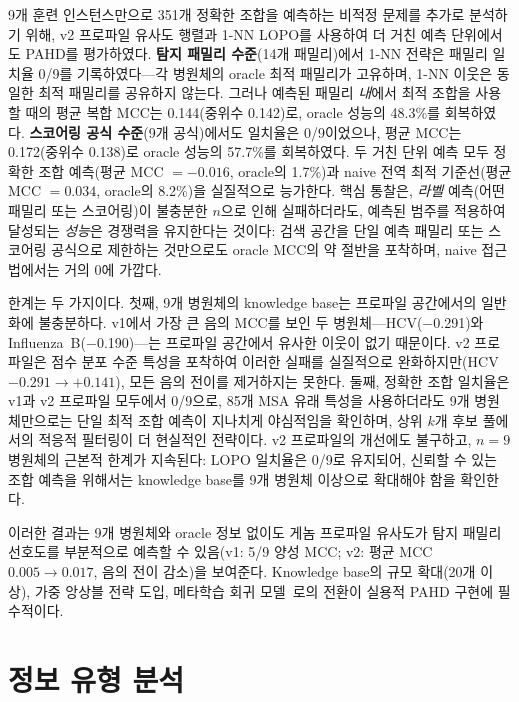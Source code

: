 9개 훈련 인스턴스만으로 351개 정확한 조합을 예측하는 비적정 문제를 추가로 분석하기 위해, v2 프로파일 유사도 행렬과 1-NN LOPO를 사용하여 더 거친 예측 단위에서도 PAHD를 평가하였다.
\textbf{탐지 패밀리 수준}(14개 패밀리)에서 1-NN 전략은 패밀리 일치율 0/9를 기록하였다---각 병원체의 oracle 최적 패밀리가 고유하며, 1-NN 이웃은 동일한 최적 패밀리를 공유하지 않는다.
그러나 예측된 패밀리 \emph{내}에서 최적 조합을 사용할 때의 평균 복합 MCC는 0.144(중위수 0.142)로, oracle 성능의 48.3\%를 회복하였다.
\textbf{스코어링 공식 수준}(9개 공식)에서도 일치율은 0/9이었으나, 평균 MCC는 0.172(중위수 0.138)로 oracle 성능의 57.7\%를 회복하였다.
두 거친 단위 예측 모두 정확한 조합 예측(평균 MCC $= -0.016$, oracle의 1.7\%)과 naive 전역 최적 기준선(평균 MCC $= 0.034$, oracle의 8.2\%)을 실질적으로 능가한다.
핵심 통찰은, \emph{라벨} 예측(어떤 패밀리 또는 스코어링)이 불충분한 $n$으로 인해 실패하더라도, 예측된 범주를 적용하여 달성되는 \emph{성능}은 경쟁력을 유지한다는 것이다: 검색 공간을 단일 예측 패밀리 또는 스코어링 공식으로 제한하는 것만으로도 oracle MCC의 약 절반을 포착하며, naive 접근법에서는 거의 0에 가깝다.

한계는 두 가지이다.
첫째, 9개 병원체의 knowledge base는 프로파일 공간에서의 일반화에 불충분하다.
v1에서 가장 큰 음의 MCC를 보인 두 병원체---HCV($-$0.291)와 Influenza~B($-$0.190)---는 프로파일 공간에서 유사한 이웃이 없기 때문이다.
v2 프로파일은 점수 분포 수준 특성을 포착하여 이러한 실패를 실질적으로 완화하지만(HCV $-0.291 \rightarrow +0.141$), 모든 음의 전이를 제거하지는 못한다.
둘째, 정확한 조합 일치율은 v1과 v2 프로파일 모두에서 0/9으로, 85개 MSA 유래 특성을 사용하더라도 9개 병원체만으로는 단일 최적 조합 예측이 지나치게 야심적임을 확인하며, 상위 $k$개 후보 풀에서의 적응적 필터링이 더 현실적인 전략이다.
v2 프로파일의 개선에도 불구하고, $n = 9$ 병원체의 근본적 한계가 지속된다: LOPO 일치율은 0/9로 유지되어, 신뢰할 수 있는 조합 예측을 위해서는 knowledge base를 9개 병원체 이상으로 확대해야 함을 확인한다.

이러한 결과는 9개 병원체와 oracle 정보 없이도 게놈 프로파일 유사도가 탐지 패밀리 선호도를 부분적으로 예측할 수 있음(v1: 5/9 양성 MCC; v2: 평균 MCC $0.005 \rightarrow 0.017$, 음의 전이 감소)을 보여준다.
Knowledge base의 규모 확대(20개 이상), 가중 앙상블 전략 도입, 메타학습 회귀 모델~\cite{rice1976algorithm,kerschke2019algorithm}로의 전환이 실용적 PAHD 구현에 필수적이다.


\section{정보 유형 분석}
\label{sec:information_analysis_kr}

